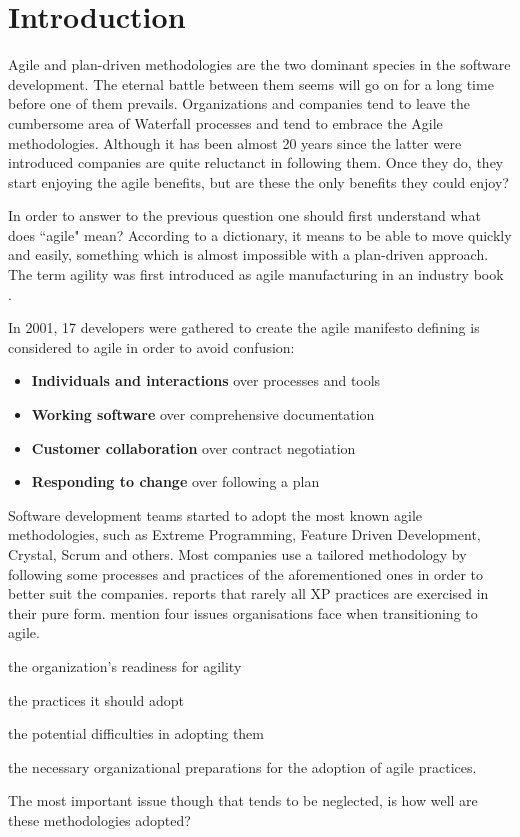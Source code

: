 \chapter{Introduction}

Agile and plan-driven methodologies are the two dominant species in the software development. The eternal battle between them seems will go on for a long time before  one of them prevails. Organizations and companies tend to leave the cumbersome area of Waterfall processes and tend to embrace the Agile methodologies. Although it has been almost 20 years since the latter were introduced companies are quite reluctanct in following them. Once they do, they start enjoying the agile benefits, but are these the only benefits they could enjoy? 

In order to answer to the previous question one should first understand what does ``agile" mean? According to a dictionary, it means to be able to move quickly and easily, something which is almost impossible with a plan-driven approach. The term agility was first introduced as agile manufacturing in an industry book \cite{agile_manufacturing}.

In 2001, 17 developers were gathered to create the agile manifesto \cite{beck2001agile} defining is considered to agile in order to avoid confusion:  
\begin{itemize}
	\item {\large \textbf{Individuals and interactions}} over processes and tools
	\item {\large \textbf{Working software}} over comprehensive documentation
	\item {\large \textbf{Customer collaboration}} over contract negotiation
	\item {\large \textbf{Responding to change}} over following a plan
\end{itemize}

Software development teams started to adopt the most known agile methodologies, such as Extreme Programming, Feature Driven Development, Crystal, Scrum and others. Most companies use a tailored methodology by following some processes and practices of the aforementioned ones in order to better suit the companies. \citet{williams2004toward} reports that rarely all XP practices are exercised in their pure form. \citet{sidky} mention four issues organisations face when transitioning to agile.
\begin{inparaenum} [a\upshape)]
\item the organization's readiness for agility
\item the practices it should adopt
\item the potential difficulties in adopting them
\item the necessary organizational preparations for the adoption of agile practices. 
\end{inparaenum}
The most important issue though that tends to be neglected, is how well are these methodologies adopted? 

